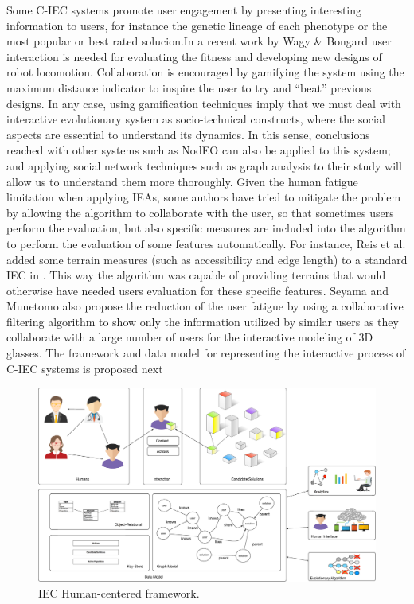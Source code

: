 Some C-IEC systems promote user engagement by presenting interesting information to 
users, for instance the genetic lineage of each phenotype or the most popular or 
best rated solucion\cite{picbreeder,forms}.In a recent work by 
Wagy \& Bongard \cite{wagy2014collective} user interaction 
is needed for evaluating the fitness and developing
new designs of robot locomotion. Collaboration is encouraged by gamifying the system 
using the maximum distance indicator to inspire the user to try and ``beat'' previous designs. 
In any case, using gamification techniques imply that we must deal with interactive evolutionary
system as socio-technical constructs, where the social aspects are
essential to understand its dynamics. In this sense, conclusions
reached with other systems such as NodEO \cite{DBLP:conf/gecco/MereloCGCRV16}
can also be applied to this system; and applying social 
network techniques such as graph analysis
to their study will allow us to understand them more thoroughly. 
Given the human fatigue limitation when applying IEAs, some authors 
have tried to mitigate the problem by allowing the algorithm to 
collaborate with the user, so that sometimes 
users perform the evaluation,  but also specific measures are included 
into the algorithm to perform the
evaluation of some features automatically. For instance, 
Reis et al. added some terrain measures (such as accessibility and edge length) 
to a standard  IEC in \cite{DBLP:journals/soco/FradeVC12}. 
This way the algorithm was capable of providing  terrains that would otherwise have needed
users evaluation for these specific features. Seyama and Munetomo \cite{seyama2016development}
also propose the reduction of the user fatigue by using 
a collaborative filtering algorithm to show only the information utilized by similar users as 
they collaborate with a large number of users for the interactive modeling of 3D glasses. 
The framework and data model for 
representing the interactive process of C-IEC systems is proposed next

\begin{figure}[!t]
    \centering
        \includegraphics[width=5.5in]{img/framework.eps}
    \caption{IEC Human-centered framework.}
    \label{fig:hc_framework}
\end{figure}

